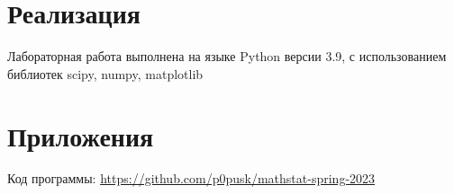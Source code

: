 \documentclass[12pt]{article}
\begin{document}


\tableofcontents
\clearpage

\listoffigures
\clearpage

\listoftables
\clearpage






\section{Реализация}
Лабораторная работа выполнена на языке Python версии 3.9, с использованием
библиотек scipy, numpy, matplotlib

\section{Приложения}
Код программы: \url{https://github.com/p0pusk/mathstat-spring-2023}
 
\end{document}
